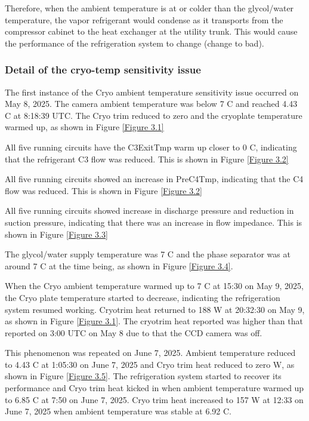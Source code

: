 Therefore, when the ambient temperature is at or colder than the glycol/water temperature, the vapor refrigerant would condense as it transports from the compressor cabinet to the heat exchanger at the utility trunk. This would cause the performance of the refrigeration system to change (change to bad).


\subsubsection{Detail of the cryo-temp sensitivity issue}
\label{sec:cryo-tempsens-detail}

The first instance of the Cryo ambient temperature sensitivity issue occurred on May 8, 2025. The camera ambient temperature was below 7 C and reached 4.43 C at 8:18:39 UTC. The Cryo trim reduced to zero and the cryoplate temperature warmed up, as shown in Figure \ref{Figure 3.1}

All five running circuits have the C3ExitTmp warm up closer to 0 C, indicating that the refrigerant C3 flow was reduced. This is shown in Figure \ref{Figure 3.2}

All five running circuits showed an increase in PreC4Tmp, indicating that the C4 flow was reduced. This is shown in Figure \ref{Figure 3.2}

All five running circuits showed increase in discharge pressure and reduction in suction pressure, indicating that there was an increase in flow impedance. This is shown in Figure \ref{Figure 3.3}

The glycol/water supply temperature was 7 C and the phase separator was at around 7 C at the time being, as shown in Figure \ref{Figure 3.4}.

When the Cryo ambient temperature warmed up to 7 C at 15:30 on May 9, 2025, the Cryo plate temperature started to decrease, indicating the refrigeration system resumed working. Cryotrim heat returned to 188 W at 20:32:30 on May 9, as shown in Figure \ref{Figure 3.1}. The cryotrim heat reported was higher than that reported on 3:00 UTC on May 8 due to that the CCD camera was off.

This phenomenon was repeated on June 7, 2025. Ambient temperature reduced to 4.43 C at 1:05:30 on June 7, 2025 and Cryo trim heat reduced to zero W, as shown in Figure \ref{Figure 3.5}. The refrigeration system started to recover its performance and Cryo trim heat kicked in when ambient temperature warmed up to 6.85 C at 7:50 on June 7, 2025. Cryo trim heat increased to 157 W at 12:33 on June 7, 2025 when ambient temperature was stable at 6.92 C.



